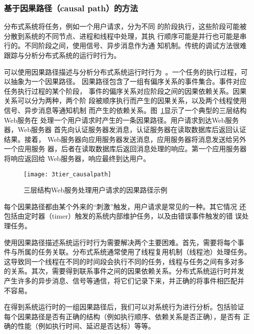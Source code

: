\subsubsection*{基于因果路径（causal path）的方法}



分布式系统将任务，例如一个用户请求，分为不同
的阶段执行，这些阶段可能被分散到系统的不同节点、进程和线程中处理，其执
行顺序可能是并行也可能是串行的。不同阶段之间，使用信号、异步消息作为通
知机制。传统的调试方法很难跟踪与分析分布式系统的运行时行为。

可以使用因果路径描述与分析分布式系统运行时行为~\cite{pinpoint, magpie,
pip, x-trace, project5}。一个任务的执行过程，可以抽象为一个因果路径。
因果路径包含了一组有偏序关系的事件集合。事件对应任务执行过程的某个阶段，
事件的偏序关系对应阶段之间的因果依赖关系。因果关系可以分为两种，两个阶
段被顺序执行而产生的因果关系，以及两个线程使用信号、异步消息等通知机制
而产生的依赖关系。图~\ref{fig:3tier}显示了一个典型的三层结构Web服务在
处理一个用户请求时产生的一条因果路径。用户请求到达Web服务器，Web服务器
首先向认证服务器发消息，认证服务器在读取数据库后返回认证结果。接着，
Web服务器向应用服务器发送消息，应用服务器将消息发送给另外一个应用服务
器，后者在读取数据库后返回消息处理的响应。第一个应用服务器将响应返回给
Web服务器，响应最终到达用户。

\begin{figure}[htbp]
\centering
\texttt{[image: 3tier\_causalpath]}
\caption{三层结构Web服务处理用户请求的因果路径示例}
\label{fig:3tier}
\end{figure}

每个因果路径都由某个外来的“刺激”触发，用户请求是常见的一种。其它情况
还包括由定时器（timer）触发的系统内部维护任务，以及由错误事件触发的错
误处理任务。

使用因果路径描述系统运行时行为需要解决两个主要困难。首先，需要将每个事
件与所属的任务关联。分布式系统通常使用了线程复用机制（线程池）处理任务。
这导致同一个线程在不同的时间段会执行不同的任务，线程与任务之间有多对多
的关系。其次，需要得到联系事件之间的因果依赖关系。分布式系统运行时并发
产生许多的异步消息、信号等通信，将它们记录下来，并正确的将事件相匹配并
不容易。

在得到系统运行时的一组因果路径后，我们可以对系统行为进行分析。包括验证
每个因果路径是否有正确的结构（例如执行顺序、依赖关系是否正确），是否有
正确的性能（例如执行时间、延迟是否达标）等等。

